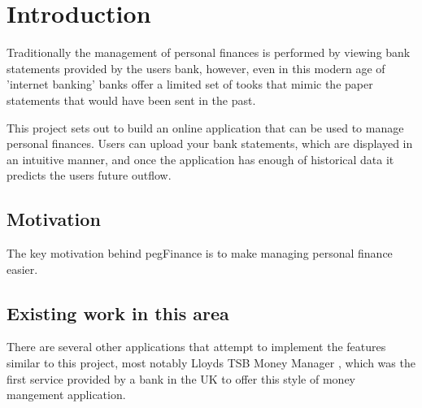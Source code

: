 \chapter{Introduction}

\begin{comment}
This chapter puts the work into context. Having read it, the reader should be left in no doubt as to:

- the topic area to which the work applies
- why the work is being done
- what else has been done in the area and by whom
 - how the author proposes to tackle the problem: The project proposal is often expressed in terms of a main objective and possibly one or more additional objectives. It is useful to define "milestones" or "sub-goals" that mark the progress towards the objectives. 
 - It is common to end this chapter with a brief overview of each of the subsequent chapters of the report.
\end{comment}

Traditionally the management of personal finances is performed by viewing bank statements provided by the users bank, however, even in this modern age of 'internet banking' banks offer a limited set of tooks that mimic the paper statements that would have been sent in the past.

This project sets out to build an online application that can be used to manage personal finances. Users can upload your bank statements, which are displayed in an intuitive manner, and once the application has enough of  historical data it predicts the users future outflow.

\section{Motivation}
The key motivation behind pegFinance is to make managing personal finance easier. 


\section{Existing work in this area}

There are several other applications that attempt to implement the features similar to this project, most notably Lloyds TSB Money Manager \cite{NEEDED}, which was the first service provided by a bank in the UK to offer this style of money mangement application.


